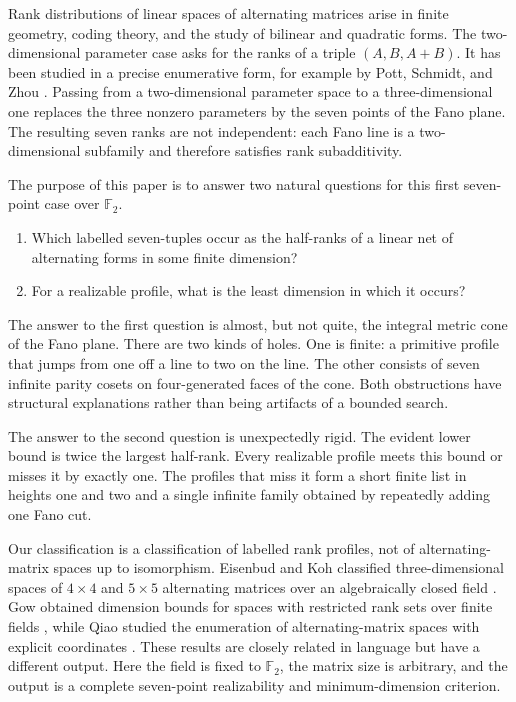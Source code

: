 \documentclass[11pt]{article}
\theoremstyle{remark}
\numberwithin{equation}{section}
\begin{document}
Rank distributions of linear spaces of alternating matrices arise in finite
geometry, coding theory, and the study of bilinear and quadratic forms. The
two-dimensional parameter case asks for the ranks of a triple
$(A,B,A+B)$. It has been studied in a precise enumerative form, for example by
Pott, Schmidt, and Zhou \cite{pott2016}. Passing from a two-dimensional parameter space to a
three-dimensional one replaces the three nonzero parameters by the seven points
of the Fano plane. The resulting seven ranks are not independent: each Fano line
is a two-dimensional subfamily and therefore satisfies rank subadditivity.

The purpose of this paper is to answer two natural questions for this first
seven-point case over $\mathbb F_2$.

\begin{enumerate}
\item Which labelled seven-tuples occur as the half-ranks of a linear net of
   alternating forms in some finite dimension?
\item For a realizable profile, what is the least dimension in which it occurs?

\end{enumerate}

The answer to the first question is almost, but not quite, the integral metric
cone of the Fano plane. There are two kinds of holes. One is finite: a primitive
profile that jumps from one off a line to two on the line. The other consists of
seven infinite parity cosets on four-generated faces of the cone. Both
obstructions have structural explanations rather than being artifacts of a
bounded search.

The answer to the second question is unexpectedly rigid. The evident lower
bound is twice the largest half-rank. Every realizable profile meets this bound
or misses it by exactly one. The profiles that miss it form a short finite list
in heights one and two and a single infinite family obtained by repeatedly
adding one Fano cut.

Our classification is a classification of labelled rank profiles, not of
alternating-matrix spaces up to isomorphism. Eisenbud and Koh classified
three-dimensional spaces of $4\times4$ and $5\times5$ alternating matrices over
an algebraically closed field \cite{eisenbud1994}. Gow obtained dimension bounds for spaces with
restricted rank sets over finite fields \cite{gow2017}, while Qiao studied the enumeration
of alternating-matrix spaces with explicit coordinates \cite{qiao2021}. These results are
closely related in language but have a different output. Here the field is fixed
to $\mathbb F_2$, the matrix size is arbitrary, and the output is a complete
seven-point realizability and minimum-dimension criterion.
\end{document}
